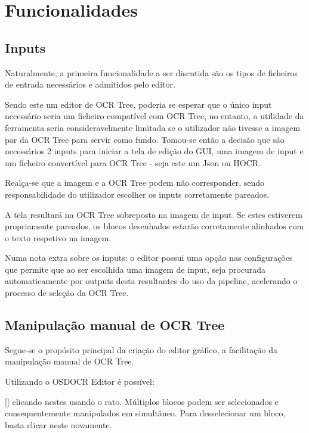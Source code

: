 \section{Funcionalidades}

\subsection{Inputs}

Naturalmente, a primeira funcionalidade a ser discutida são os tipos de ficheiros de entrada necessários e admitidos pelo editor.

Sendo este um editor de OCR Tree, poderia se esperar que o único input necessário seria um ficheiro compatível com OCR Tree, no entanto, a utilidade da ferramenta seria consideravelmente limitada se o utilizador não tivesse a imagem par da OCR Tree para servir como fundo. Tomou-se então a decisão que são necessários 2 inputs para iniciar a tela de edição do GUI, uma imagem de input e um ficheiro convertível para OCR Tree - seja este um Json ou HOCR.

Realça-se que a imagem e a OCR Tree podem não corresponder, sendo responsabilidade do utilizador escolher os inputs corretamente pareados. 

A tela resultará na OCR Tree sobreposta na imagem de input. Se estes estiverem propriamente pareados, os blocos desenhados estarão corretamente alinhados com o texto respetivo na imagem.




Numa nota extra sobre os inputs: o editor possui uma opção nas configurações que permite que ao ser escolhida uma imagem de input, seja procurada automaticamente por outputs desta resultantes do uso da pipeline, acelerando o processo de seleção da OCR Tree.


\subsection{Manipulação manual de OCR Tree}

Segue-se o propósito principal da criação do editor gráfico, a facilitação da manipulação manual de OCR Tree.

Utilizando o OSDOCR Editor é possível:

[\normalsize] clicando nestes usando o rato. Múltiplos blocos podem ser selecionados e consequentemente manipulados em simultâneo. Para desselecionar um bloco, basta clicar neste novamente.

